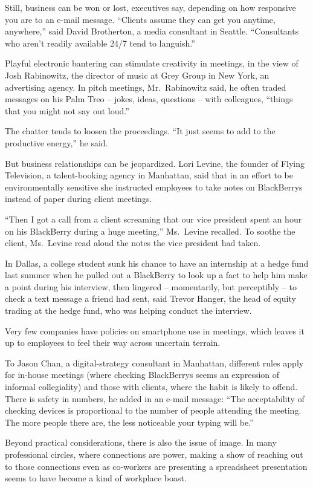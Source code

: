 ﻿\documentclass[12pt,a4paper,onecolumn]{article}
\begin{document}
Still, business can be won or lost, executives say, depending on how responsive you are to an e-mail
message. ``Clients assume they can get you anytime, anywhere,'' said David Brotherton, a media
consultant in Seattle. ``Consultants who aren't readily available 24/7 tend to languish.''

Playful electronic bantering can stimulate creativity in meetings, in the view of Josh Rabinowitz,
the director of music at Grey Group in New York, an advertising agency. In pitch meetings,
Mr.~Rabinowitz said, he often traded messages on his Palm Treo -- jokes, ideas, questions -- with
colleagues, ``things that you might not say out loud.''

The chatter tends to loosen the proceedings. ``It just seems to add to the productive energy,'' he
said.

But business relationships can be jeopardized. Lori Levine, the founder of Flying Television, a
talent-booking agency in Manhattan, said that in an effort to be environmentally sensitive she
instructed employees to take notes on BlackBerrys instead of paper during client meetings.

``Then I got a call from a client screaming that our vice president spent an hour on his BlackBerry
during a huge meeting,'' Ms.~Levine recalled. To soothe the client, Ms.~Levine read aloud the notes
the vice president had taken.

In Dallas, a college student sunk his chance to have an internship at a hedge fund last summer when
he pulled out a BlackBerry to look up a fact to help him make a point during his interview, then
lingered -- momentarily, but perceptibly -- to check a text message a friend had sent, said Trevor
Hanger, the head of equity trading at the hedge fund, who was helping conduct the interview.

Very few companies have policies on smartphone use in meetings, which leaves it up to employees to
feel their way across uncertain terrain.

To Jason Chan, a digital-strategy consultant in Manhattan, different rules apply for in-house
meetings (where checking BlackBerrys seems an expression of informal collegiality) and those with
clients, where the habit is likely to offend. There is safety in numbers, he added in an e-mail
message: ``The acceptability of checking devices is proportional to the number of people attending
the meeting. The more people there are, the less noticeable your typing will be.''

Beyond practical considerations, there is also the issue of image. In many professional circles,
where connections are power, making a show of reaching out to those connections even as co-workers
are presenting a spreadsheet presentation seems to have become a kind of workplace boast.
\end{document}
